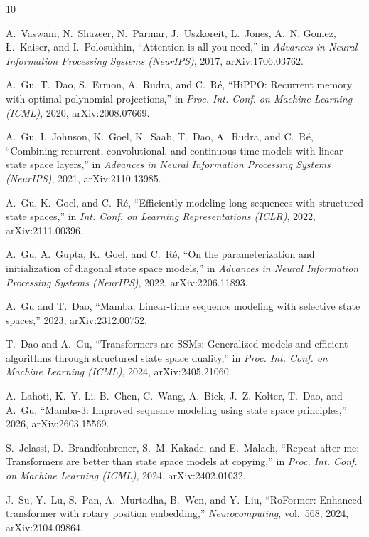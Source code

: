 \documentclass[conference]{IEEEtran}
\newcommand{\mamba}{Mamba}
\begin{document}
\begin{thebibliography}{10}

A.~Vaswani, N.~Shazeer, N.~Parmar, J.~Uszkoreit, L.~Jones, A.~N. Gomez,
{\L}.~Kaiser, and I.~Polosukhin, ``Attention is all you need,'' in
\emph{Advances in Neural Information Processing Systems (NeurIPS)}, 2017,
arXiv:1706.03762.

A.~Gu, T.~Dao, S.~Ermon, A.~Rudra, and C.~R{\'e}, ``HiPPO: Recurrent memory
with optimal polynomial projections,'' in \emph{Proc. Int. Conf. on Machine
Learning (ICML)}, 2020, arXiv:2008.07669.

A.~Gu, I.~Johnson, K.~Goel, K.~Saab, T.~Dao, A.~Rudra, and C.~R{\'e},
``Combining recurrent, convolutional, and continuous-time models with linear
state space layers,'' in \emph{Advances in Neural Information Processing
Systems (NeurIPS)}, 2021, arXiv:2110.13985.

A.~Gu, K.~Goel, and C.~R{\'e}, ``Efficiently modeling long sequences with
structured state spaces,'' in \emph{Int. Conf. on Learning Representations
(ICLR)}, 2022, arXiv:2111.00396.

A.~Gu, A.~Gupta, K.~Goel, and C.~R{\'e}, ``On the parameterization and
initialization of diagonal state space models,'' in \emph{Advances in Neural
Information Processing Systems (NeurIPS)}, 2022, arXiv:2206.11893.

A.~Gu and T.~Dao, ``\mamba{}: Linear-time sequence modeling with selective
state spaces,'' 2023, arXiv:2312.00752.

T.~Dao and A.~Gu, ``Transformers are SSMs: Generalized models and efficient
algorithms through structured state space duality,'' in \emph{Proc. Int.
Conf. on Machine Learning (ICML)}, 2024, arXiv:2405.21060.

A.~Lahoti, K.~Y. Li, B.~Chen, C.~Wang, A.~Bick, J.~Z. Kolter, T.~Dao, and
A.~Gu, ``\mamba{}-3: Improved sequence modeling using state space
principles,'' 2026, arXiv:2603.15569.

S.~Jelassi, D.~Brandfonbrener, S.~M. Kakade, and E.~Malach, ``Repeat after
me: Transformers are better than state space models at copying,'' in
\emph{Proc. Int. Conf. on Machine Learning (ICML)}, 2024, arXiv:2402.01032.

J.~Su, Y.~Lu, S.~Pan, A.~Murtadha, B.~Wen, and Y.~Liu, ``RoFormer: Enhanced
transformer with rotary position embedding,'' \emph{Neurocomputing}, vol.~568,
2024, arXiv:2104.09864.

\end{thebibliography}
\end{document}
